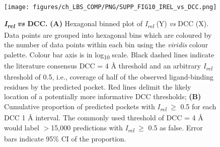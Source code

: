 \begin{figure}[htb!]
    \centering
    \texttt{[image: figures/ch\_LBS\_COMP/PNG/SUPP\_FIG10\_IREL\_vs\_DCC.png]}
    \caption[\textit{I\textsubscript{rel}} \textit{vs} DCC]{\textbf{\textit{I\textsubscript{rel}} \textit{vs} DCC.} \textbf{(A)} Hexagonal binned plot of \textit{I\textsubscript{rel}} (Y) \textit{vs} DCC (X). Data points are grouped into hexagonal bins which are coloured by the number of data points within each bin using the \textit{viridis} colour palette. Colour bar axis is in log\textsubscript{10} scale. Black dashed lines indicate the literature consensus DCC = 4 \AA{} threshold and an arbitrary \textit{I\textsubscript{rel}} threshold of 0.5, i.e., coverage of half of the observed ligand-binding residues by the predicted pocket.  Red lines delimit the likely location of a potentially more informative DCC thresholds; \textbf{(B)} Cumulative proportion of predicted pockets with \textit{I\textsubscript{rel}} $\geq$ 0.5 for each DCC 1 \AA{} interval. The commonly used threshold of DCC = 4 \AA{} would label $>$15,000 predictions with \textit{I\textsubscript{rel}} $\geq$ 0.5 as false. Error bars indicate 95\% CI of the proportion.}
    \label{fig:irel_vs_dcc}
\end{figure}

